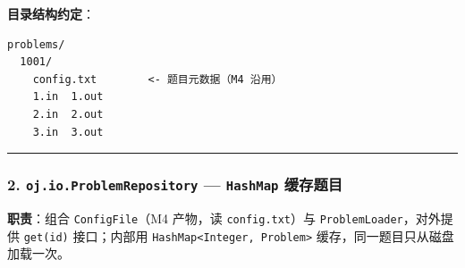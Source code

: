 \documentclass[
  11pt,
]{ctexart}
\begin{document}
\textbf{目录结构约定}：

\begin{verbatim}
problems/
  1001/
    config.txt        <- 题目元数据（M4 沿用）
    1.in  1.out
    2.in  2.out
    3.in  3.out
\end{verbatim}

\begin{center}\rule{0.5\linewidth}{0.5pt}\end{center}

\hypertarget{oj.io.problemrepository-hashmap-ux7f13ux5b58ux9898ux76ee}{%
\subsubsection{\texorpdfstring{2. \texttt{oj.io.ProblemRepository} ---
\texttt{HashMap}
缓存题目}{2. oj.io.ProblemRepository --- HashMap 缓存题目}}\label{oj.io.problemrepository-hashmap-ux7f13ux5b58ux9898ux76ee}}

\textbf{职责}：组合 \texttt{ConfigFile}（M4 产物，读
\texttt{config.txt}）与 \texttt{ProblemLoader}，对外提供
\texttt{get(id)} 接口；内部用
\texttt{HashMap\textless{}Integer,\ Problem\textgreater{}}
缓存，同一题目只从磁盘加载一次。
\end{document}
